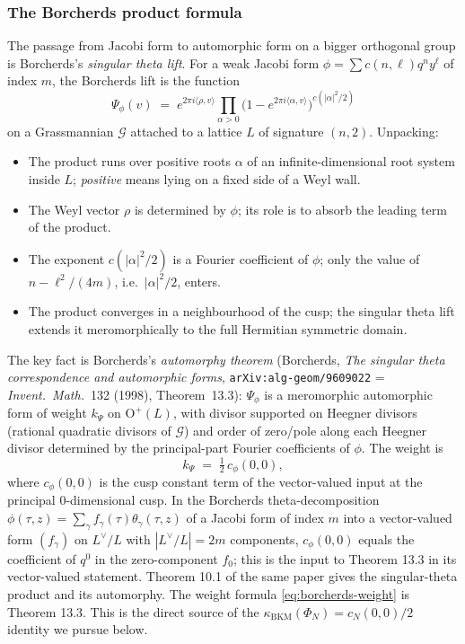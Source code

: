 \subsubsection{The Borcherds product formula}

The passage from Jacobi form to automorphic form on a bigger orthogonal group is Borcherds's \emph{singular theta lift}. For a weak Jacobi form $\phi = \sum c(n, \ell) q^n y^\ell$ of index $m$, the Borcherds lift is the function
\begin{equation}
 \Psi_\phi(v) \;=\; e^{2\pi i \langle \rho, v\rangle} \prod_{\alpha > 0} \bigl(1 - e^{2\pi i \langle \alpha, v\rangle}\bigr)^{c(|\alpha|^2/2)}
 \label{eq:borcherds-product}
\end{equation}
on a Grassmannian $\mathcal G$ attached to a lattice $L$ of signature $(n, 2)$. Unpacking:

\begin{itemize}
 \item The product runs over positive roots $\alpha$ of an infinite-dimensional root system inside $L$; \emph{positive} means lying on a fixed side of a Weyl wall.
 \item The Weyl vector $\rho$ is determined by $\phi$; its role is to absorb the leading term of the product.
 \item The exponent $c(|\alpha|^2 / 2)$ is a Fourier coefficient of $\phi$; only the value of $n - \ell^2/(4m)$, i.e.\ $|\alpha|^2/2$, enters.
 \item The product converges in a neighbourhood of the cusp; the singular theta lift extends it meromorphically to the full Hermitian symmetric domain.
\end{itemize}

The key fact is Borcherds's \emph{automorphy theorem} (Borcherds, \emph{The singular theta correspondence and automorphic forms}, \texttt{arXiv:alg-geom/9609022} = \emph{Invent.\ Math.}\ 132 (1998), Theorem~13.3): $\Psi_\phi$ is a meromorphic automorphic form of weight $k_\Psi$ on $\mathrm{O}^+(L)$, with divisor supported on Heegner divisors (rational quadratic divisors of $\mathcal G$) and order of zero/pole along each Heegner divisor determined by the principal-part Fourier coefficients of $\phi$. The weight is
\begin{equation}
 k_\Psi \;=\; \tfrac12 \, c_\phi(0, 0),
 \label{eq:borcherds-weight}
\end{equation}
where $c_\phi(0, 0)$ is the cusp constant term of the vector-valued input at the principal $0$-dimensional cusp. In the Borcherds theta-decomposition $\phi(\tau, z) = \sum_\gamma f_\gamma(\tau) \theta_\gamma(\tau, z)$ of a Jacobi form of index $m$ into a vector-valued form $(f_\gamma)$ on $L^\vee / L$ with $|L^\vee / L| = 2m$ components, $c_\phi(0, 0)$ equals the coefficient of $q^0$ in the zero-component $f_0$; this is the input to Theorem 13.3 in its vector-valued statement. Theorem 10.1 of the same paper gives the singular-theta product and its automorphy. The weight formula \eqref{eq:borcherds-weight} is Theorem 13.3. This is the direct source of the $\kappa_{\mathrm{BKM}}(\Phi_N) = c_N(0, 0)/2$ identity we pursue below.

